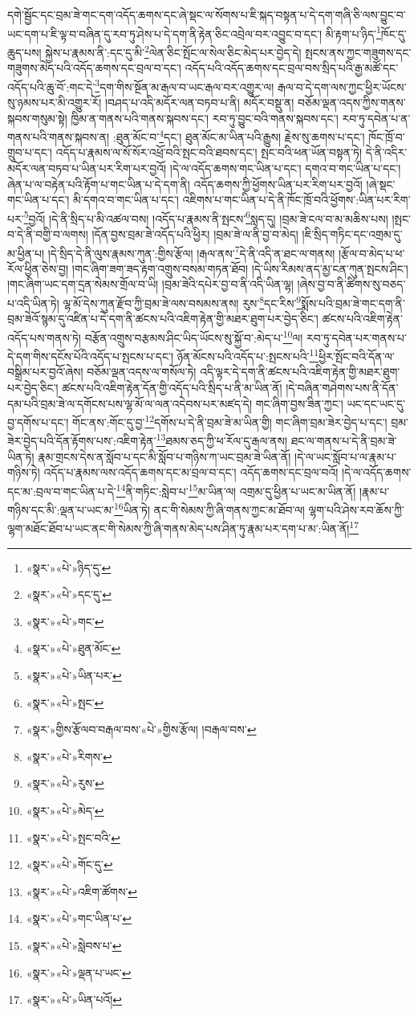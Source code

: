 དགེ་སྦྱོང་དང་བྲམ་ཟེ་གང་དག་འདོད་ཆགས་དང་ཞེ་སྡང་ལ་སོགས་པ་ཇི་སྐད་བསྟན་པ་དེ་དག་གཞི་ཅི་ལས་བྱུང་བ་ཡང་དག་པ་ཇི་ལྟ་བ་བཞིན་དུ་རབ་ཏུ་ཤེས་པ་དེ་དག་ནི་རྟེན་ཅིང་འབྲེལ་བར་འབྱུང་བ་དང་། མི་རྟག་པ་ཉིད་\footnote{«སྣར་»«པེ་»ཉིད་དུ་}ཁོང་དུ་ཆུད་པས། སྐྱེས་པ་རྣམས་ནི་:དང་དུ་མི་\footnote{«སྣར་»«པེ་»དང་དུ་}ལེན་ཅིང་སྤོང་ལ་སེལ་ཅིང་མེད་པར་བྱེད་དེ། སྤངས་ནས་ཀྱང་གཟུགས་དང་གཟུགས་མེད་པའི་འདོད་ཆགས་དང་བྲལ་བ་དང་། འདོད་པའི་འདོད་ཆགས་དང་བྲལ་བས་སྲིད་པའི་རྒྱ་མཚོ་དང་འདོད་པའི་ཆུ་བོ་:གང་དེ་\footnote{«སྣར་»«པེ་»གང་}དག་གིས་སྔོན་མ་རྒལ་བ་ཡང་རྒལ་བར་འགྱུར་ལ། རྒལ་བ་དེ་དག་ལས་ཀྱང་ཕྱིར་ཡོངས་སུ་ཉམས་པར་མི་འགྱུར་རོ། །བཤད་པ་འདི་མདོར་ལན་བཏབ་པ་ནི། མདོར་བསྡུ་ན། བཅོམ་ལྡན་འདས་ཀྱིས་གནས་སྐབས་གསུམ་སྟེ། ཁྱིམ་ན་གནས་པའི་གནས་སྐབས་དང་། རབ་ཏུ་བྱུང་བའི་གནས་སྐབས་དང་། རབ་ཏུ་དབེན་པ་ན་གནས་པའི་གནས་སྐབས་ན། :ཐུན་མོང་བ་\footnote{«སྣར་»«པེ་»ཐུན་མོང་}དང་། ཐུན་མོང་མ་ཡིན་པའི་རྒྱུས། རྗེས་སུ་ཆགས་པ་དང་། ཁོང་ཁྲོ་བ་གྲུབ་པ་དང་། འདོད་པ་རྣམས་ལ་སོ་སོར་འཕྲོ་བའི་སྤང་བའི་ཐབས་དང་། སྤང་བའི་ཕན་ཡོན་བསྟན་ཏེ། དེ་ནི་འདིར་མདོར་ལན་བཏབ་པ་ཡིན་པར་རིག་པར་བྱའོ། །དེ་ལ་འདོད་ཆགས་གང་ཡིན་པ་དང་། དགའ་བ་གང་ཡིན་པ་དང་། ཞེན་པ་ལ་བརྟེན་པའི་རྟོག་པ་གང་ཡིན་པ་དེ་དག་ནི། འདོད་ཆགས་ཀྱི་ཕྱོགས་ཡིན་པར་རིག་པར་བྱའོ། །ཞེ་སྡང་གང་ཡིན་པ་དང་། མི་དགའ་བ་གང་ཡིན་པ་དང་། འཇིགས་པ་གང་ཡིན་པ་དེ་ནི་ཁོང་ཁྲོ་བའི་ཕྱོགས་:ཡིན་པར་རིག་པར་\footnote{«སྣར་»«པེ་»ཡིན་པར་}བྱའོ། །དེ་ནི་སྲིད་པ་མི་འཚལ་བས། །འདོད་པ་རྣམས་ནི་སྤངས་\footnote{«སྣར་»«པེ་»སྤང་}སླད་དུ། །བྲམ་ཟེ་ངལ་བ་མ་མཆིས་པས། །སྤང་བ་དེ་ནི་བགྱི་བ་ལགས། །དོན་བྱས་བྲམ་ཟེ་འདོད་པའི་ཕྱིར། །བྲམ་ཟེ་ལ་ནི་བྱ་བ་མེད། །ཇི་སྲིད་གཏིང་དང་འགྲམ་དུ་མ་ཕྱིན་པ། །དེ་སྲིད་དེ་ནི་ལུས་རྣམས་ཀུན་:གྱིས་རྩོལ། །རྒལ་ནས་\footnote{«སྣར་»གྱིས་རྩོལབ་བརྒལ་བས་«པེ་»གྱིས་རྩོལ། །བརྒལ་བས་}དེ་ནི་འདི་ན་ཐང་ལ་གནས། །རྩོལ་བ་མེད་པ་ཕ་རོལ་ཕྱིན་ཅེས་བྱ། །གང་ཞིག་ཟག་ཟད་རྟག་འགྲུས་བསམ་གཏན་ཐོབ། །དེ་ཡིས་རིམས་ནད་མྱ་ངན་ཀུན་སྤངས་ཤིང་། །གང་ཞིག་ཡང་དག་དྲན་སེམས་གྲོལ་བ་ཡི། །བྲམ་ཟེའི་དཔེར་བྱ་བ་ནི་འདི་ཡིན་ལྷ། །ཞེས་བྱ་བ་ནི་ཚིགས་སུ་བཅད་པ་འདི་ཡིན་ཏེ། ལྷ་མོ་དེས་ཀུན་རྫོབ་ཀྱི་བྲམ་ཟེ་ལས་བསམས་ནས། རུས་\footnote{«སྣར་»«པེ་»རིགས་}དང་རིས་\footnote{«སྣར་»«པེ་»རུས་}སྨོས་པའི་བྲམ་ཟེ་གང་དག་ནི་བྲམ་ཟེའོ་སྙམ་དུ་འཛིན་པ་དེ་དག་ནི་ཚངས་པའི་འཇིག་རྟེན་གྱི་མཐར་ཐུག་པར་བྱེད་ཅིང་། ཚངས་པའི་འཇིག་རྟེན་འདོད་པས་གནས་ཏེ། བརྩོན་འགྲུས་བརྩམས་ཤིང་ཡིད་ཡོངས་སུ་སྐྱོ་བ་:མེད་པ་\footnote{«སྣར་»«པེ་»མེད་}ལ། རབ་ཏུ་དབེན་པར་གནས་པ་དེ་དག་གིས་དངོས་པོའི་འདོད་པ་སྤངས་པ་དང་། ཉོན་མོངས་པའི་འདོད་པ་:སྤངས་པའི་\footnote{«སྣར་»«པེ་»སྤང་བའི་}ཕྱིར་སྤོང་བའི་དོན་ལ་བསྒྲིམ་པར་བྱའོ་ཞེས། བཅོམ་ལྡན་འདས་ལ་གསོལ་ཏེ། འདི་ལྟར་དེ་དག་ནི་ཚངས་པའི་འཇིག་རྟེན་གྱི་མཐར་ཐུག་པར་བྱེད་ཅིང་། ཚངས་པའི་འཇིག་རྟེན་དོན་གྱི་འདོད་པའི་སྲིད་པ་ནི་མ་ཡིན་ནོ། །དེ་བཞིན་གཤེགས་པས་ནི་དོན་དམ་པའི་བྲམ་ཟེ་ལ་དགོངས་པས་ལྷ་མོ་ལ་ལན་འདེབས་པར་མཛད་དེ། གང་ཞིག་བྱས་ཟིན་ཀྱང་། ཡང་དང་ཡང་དུ་བྱ་དགོས་པ་དང་། གོང་ནས་:གོང་དུ་བྱ་\footnote{«སྣར་»«པེ་»གོང་དུ་}དགོས་པ་དེ་ནི་བྲམ་ཟེ་མ་ཡིན་གྱི། གང་ཞིག་བྲམ་ཟེར་བྱེད་པ་དང་། བྲམ་ཟེར་བྱེད་པའི་དོན་རྟོགས་པས་:འཇིག་རྟེན་\footnote{«སྣར་»«པེ་»འཇིག་ཚོགས་}ཐམས་ཅད་ཀྱི་ཕ་རོལ་དུ་རྒལ་ནས། ཐང་ལ་གནས་པ་དེ་ནི་བྲམ་ཟེ་ཡིན་ཏེ། རྣམ་གྲངས་དེས་ན་སློབ་པ་དང་མི་སློབ་པ་གཉིས་ཀ་ཡང་བྲམ་ཟེ་ཡིན་ནོ། །དེ་ལ་ཡང་སློབ་པ་ལ་རྣམ་པ་གཉིས་ཏེ། འདོད་པ་རྣམས་ལས་འདོད་ཆགས་དང་མ་བྲལ་བ་དང་། འདོད་ཆགས་དང་བྲལ་བའོ། །དེ་ལ་འདོད་ཆགས་དང་མ་:བྲལ་བ་གང་ཡིན་པ་དེ་\footnote{«སྣར་»«པེ་»གང་ཡིན་པ་}ནི་གཏིང་:སླེབ་པ་\footnote{«སྣར་»«པེ་»སླེབས་པ་}མ་ཡིན་ལ། འགྲམ་དུ་ཕྱིན་པ་ཡང་མ་ཡིན་ནོ། །རྣམ་པ་གཉིས་དང་མི་:ལྡན་པ་ཡང་མ་\footnote{«སྣར་»«པེ་»ལྡན་པ་ཡང་}ཡིན་ཏེ། ནང་གི་སེམས་ཀྱི་ཞི་གནས་ཀྱང་མ་ཐོབ་ལ། ལྷག་པའི་ཤེས་རབ་ཆོས་ཀྱི་ལྷག་མཐོང་ཐོབ་པ་ཡང་ནང་གི་སེམས་ཀྱི་ཞི་གནས་མེད་པས་ཤིན་ཏུ་རྣམ་པར་དག་པ་མ་:ཡིན་ནོ།\footnote{«སྣར་»«པེ་»ཡིན་པའོ།} 